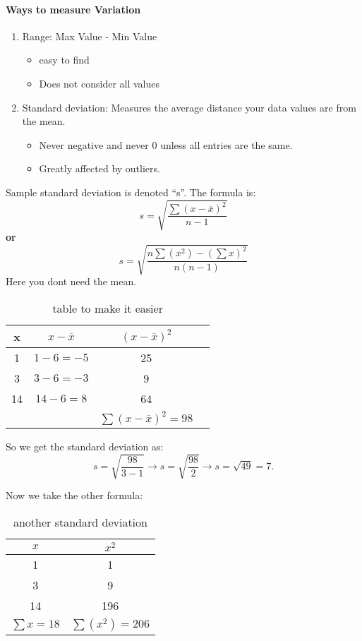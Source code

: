 \documentclass{book}
\begin{document}
\paragraph{Ways to measure Variation}
\begin{enumerate}
    \item Range: Max Value - Min Value
        \begin{itemize}
            \item easy to find
            \item Does not consider all values
        \end{itemize}
    \item Standard deviation: 
        Measures the average distance your data values are from the mean.
        \begin{itemize}
            \item Never negative and never 0 unless all entries are the same.
            \item Greatly affected by outliers.
        \end{itemize}
\end{enumerate}
Sample standard deviation is denoted ``s''.
The formula is:
\[s= \sqrt{\frac{\sum (x-\overline{x})^2}{n-1}}  \] 
\textbf{or}
\[s= \sqrt{\frac{n\sum (x^2) - (\sum x)^2 }{n(n-1)}}   \] 
Here you dont need the mean.


\vspace{50pt}

\begin{table}[htbp]
    \centering
    \begin{tabular}{c|c|c|c}
        x & $x-\overline{x}$ & $(x-\overline{x})^2$ & \\
        \midrule
        1  & $1-6=-5$ & 25 &  \\
        3  & $3-6=-3$ & 9  &  \\
        14 & $14-6=8$ & 64 &  \\
        \midrule
           &          &$\sum (x-\overline{x})^2 = 98$
    \end{tabular}
    \caption{table to make it easier}
\end{table}

So we get the standard deviation as:
\[
    s= \sqrt{\frac{98}{3-1}} \to s=\sqrt{\frac{98}{2}} \to s=\sqrt{49} = 7
.\] 

Now we take the other formula:
\begin{table}[htbp]
    \centering
    \begin{tabular}{c|c}
        \toprule
        $x$ & $x^2$ \\
        \midrule
        1 & 1 \\
        3 & 9 \\
        14 & 196 \\
        \midrule
        $\sum x=18$ & $\sum(x^2)=206$ \\
        \bottomrule
    \end{tabular}
    \caption{another standard deviation }
\end{table}
\end{document}
